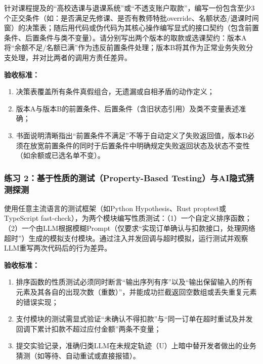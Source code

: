 \documentclass[UTF8,a4paper,11pt,fontset=fandol]{ctexart}
\begin{document}
针对课程提及的“高校选课与退课系统”或“不透支账户取款”，编写一份包含至少3个正交条件（如：是否满足先修课、是否有教师特批override、名额状态/退课时间窗）的决策表；随后用代码或伪代码为其核心操作编写显式的接口契约（包含前置条件、后置条件与类不变量）。请分别写出两个版本的取款或选课契约：版本A将“余额不足/名额已满”作为违反前置条件处理；版本B将其作为正常业务失败分支处理，并对比两者的调用方责任差异。

\par{}\textbf{验收标准：}

\begin{enumerate}
\item 决策表覆盖所有条件真假组合，无遗漏或自相矛盾的动作定义；

\item 版本A与版本B的前置条件、后置条件（含旧状态引用）及类不变量表述准确；

\item 书面说明清晰指出“前置条件不满足”不等于自动定义了失败返回值，版本B必须在放宽前置条件的同时于后置条件中明确规定失败返回状态及状态不变性（如余额或已选名单不变）。
\end{enumerate}

\subsubsection*{练习 2：基于性质的测试（Property-Based Testing）与AI隐式猜测探测}

使用任意主流语言的测试框架（如Python Hypothesis、Rust proptest或TypeScript fast-check），为两个模块编写性质测试：（1）一个自定义排序函数；（2）一个由LLM根据模糊Prompt（仅要求“实现订单确认与扣款接口，处理网络超时”）生成的模拟支付模块。通过注入并发回调与超时模拟，运行测试并观察LLM重写两次代码后的行为差异。

\par{}\textbf{验收标准：}

\begin{enumerate}
\item 排序函数的性质测试必须同时断言“输出序列有序”以及“输出保留输入的所有元素及其各自的出现次数（重数）”，并能成功拦截返回空数组或丢失重复元素的错误实现；

\item 支付模块的测试需显式验证“未确认不得扣款”与“同一订单在超时重试及并发回调下累计扣款不超过应付金额”两条不变量；

\item 提交实验记录，准确归类LLM在未规定轨迹（U）上暗中替开发者做出的业务猜测（如等待、自动重试或直接报错）。
\end{enumerate}
\end{document}
